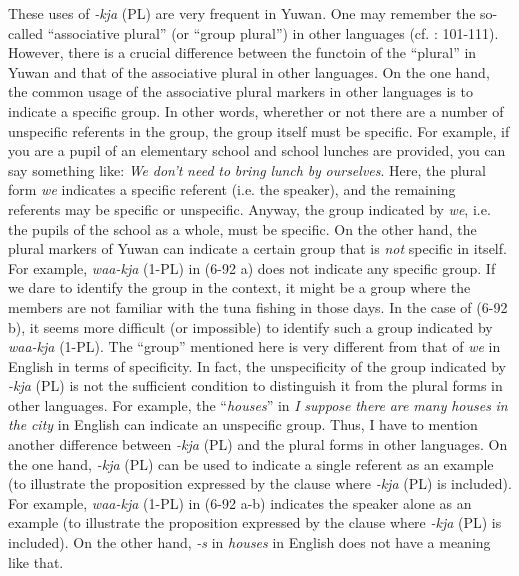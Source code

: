   These uses of \textit{{}-kja} (PL) are very frequent in Yuwan. One may remember the so-called “associative plural” (or “group plural”) in other languages (cf. \citealt{Corbett2000}: 101-111). However, there is a crucial difference between the functoin of the “plural” in Yuwan and that of the associative plural in other languages. On the one hand, the common usage of the associative plural markers in other languages is to indicate a specific group. In other words, wherether or not there are a number of unspecific referents in the group, the group itself must be specific. For example, if you are a pupil of an elementary school and school lunches are provided, you can say something like: \textit{We} \textit{don’t} \textit{need} \textit{to} \textit{bring} \textit{lunch} \textit{by} \textit{ourselves}. Here, the plural form \textit{we} indicates a specific referent (i.e. the speaker), and the remaining referents may be specific or unspecific. Anyway, the group indicated by \textit{we}, i.e. the pupils of the school as a whole, must be specific. On the other hand, the plural markers of Yuwan can indicate a certain group that is \textit{not} specific in itself. For example, \textit{waa-kja} (1-PL) in (6-92 a) does not indicate any specific group. If we dare to identify the group in the context, it might be a group where the members are not familiar with the tuna fishing in those days. In the case of (6-92 b), it seems more difficult (or impossible) to identify such a group indicated by \textit{waa-kja} (1-PL). The “group” mentioned here is very different from that of \textit{we} in English in terms of specificity. In fact, the unspecificity of the group indicated by \textit{{}-kja} (PL) is not the sufficient condition to distinguish it from the plural forms in other languages. For example, the “\textit{houses}” in \textit{I} \textit{suppose} \textit{there} \textit{are} \textit{many} \textit{houses} \textit{in} \textit{the} \textit{city} in English can indicate an unspecific group. Thus, I have to mention another difference between \textit{{}-kja} (PL) and the plural forms in other languages. On the one hand, \textit{{}-kja} (PL) can be used to indicate a single referent as an example (to illustrate the proposition expressed by the clause where \textit{{}-kja} (PL) is included). For example, \textit{waa-kja} (1-PL) in (6-92 a-b) indicates the speaker alone as an example (to illustrate the proposition expressed by the clause where \textit{{}-kja} (PL) is included). On the other hand, \textit{{}-s} in \textit{houses} in English does not have a meaning like that.

